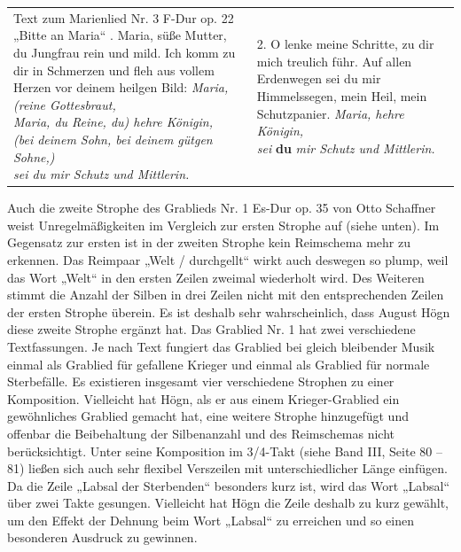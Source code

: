 \documentclass[a4paper]{article}
\begin{document}
\begin{flushleft}
\tablefirsthead{}
\tablehead{}
\tabletail{}
\tablelasttail{}
\begin{supertabular}{m{7.9230003cm}m{7.9230003cm}}
Text zum Marienlied Nr. 3 F-Dur op. 22 „Bitte an Maria“\newline
{}. Maria, süße Mutter, \newline
du Jungfrau rein und mild.\newline
Ich komm zu dir in Schmerzen \newline
und fleh aus vollem Herzen\newline
vor deinem heilgen Bild:\newline
\textit{Maria, (reine Gottesbraut, \newline
Maria, du Reine, du) hehre Königin,\newline
(bei deinem Sohn, bei deinem gütgen Sohne,) \newline
sei du mir Schutz und Mittlerin.} &
2. O lenke meine Schritte, \newline
zu dir mich treulich führ.\newline
Auf allen Erdenwegen\newline
sei du mir Himmelssegen, \newline
mein Heil, mein Schutzpanier. \newline
\textit{Maria, hehre Königin,\newline
sei  }\textbf{du}\textit{ mir Schutz und Mittlerin.}\\
\end{supertabular}
\end{flushleft}
Auch die zweite Strophe des Grablieds Nr. 1 Es-Dur op. 35 von Otto
Schaffner weist Unregelmäßigkeiten im Vergleich zur ersten Strophe auf
(siehe unten). Im Gegensatz zur ersten ist in der zweiten Strophe kein
Reimschema mehr zu erkennen. Das Reimpaar „Welt / durchgellt“ wirkt
auch deswegen so plump, weil das Wort „Welt“ in den ersten Zeilen
zweimal wiederholt wird. Des Weiteren stimmt die Anzahl der Silben in
drei Zeilen nicht mit den entsprechenden Zeilen der ersten Strophe
überein. Es ist deshalb sehr wahrscheinlich, dass August Högn diese
zweite Strophe ergänzt hat. Das Grablied Nr. 1 hat zwei verschiedene
Textfassungen. Je nach Text fungiert das Grablied bei gleich bleibender
Musik einmal als Grablied für gefallene Krieger und einmal als Grablied
für normale Sterbefälle. Es existieren insgesamt vier verschiedene
Strophen zu einer Komposition. Vielleicht hat Högn, als er aus einem
Krieger-Grablied ein gewöhnliches Grablied gemacht hat, eine weitere
Strophe hinzugefügt und offenbar die Beibehaltung der Silbenanzahl und
des Reimschemas nicht berücksichtigt. Unter seine Komposition im
3/4-Takt (siehe Band III, Seite 80 – 81) ließen sich auch sehr flexibel
Verszeilen mit unterschiedlicher Länge einfügen. Da die Zeile „Labsal
der Sterbenden“ besonders kurz ist, wird das Wort „Labsal“ über zwei
Takte gesungen. Vielleicht hat Högn die Zeile deshalb zu kurz gewählt,
um den Effekt der Dehnung beim Wort „Labsal“ zu erreichen und so einen
besonderen Ausdruck zu gewinnen.
\end{document}
